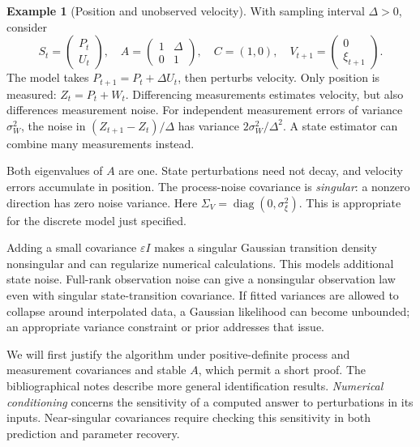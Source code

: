 \documentclass[11pt,twoside]{article}
\DeclareMathOperator{\diag}{diag}
\theoremstyle{definition}
\newtheorem{example}[theorem]{Example}
\theoremstyle{remark}
\begin{document}
\begin{example}[Position and unobserved velocity]
\label{eg:position-velocity}
With sampling interval \(\Delta>0\), consider
\[
 S_t=\begin{pmatrix}P_t\\U_t\end{pmatrix},\quad
 A=\begin{pmatrix}1&\Delta\\0&1\end{pmatrix},\quad C=(1,0),
 \quad V_{t+1}=\begin{pmatrix}0\\\xi_{t+1}\end{pmatrix}.
\]
The model takes \(P_{t+1}=P_t+\Delta U_t\), then perturbs velocity.
Only position is measured: \(Z_t=P_t+W_t\).
Differencing measurements estimates velocity, but also differences
measurement noise. For independent measurement errors of variance
\(\sigma_W^2\), the noise in
\((Z_{t+1}-Z_t)/\Delta\) has variance \(2\sigma_W^2/\Delta^2\).
A state estimator can combine many measurements instead.

Both eigenvalues of \(A\) are one. State perturbations need not decay,
and velocity errors accumulate in position.
The process-noise covariance is \emph{singular}: a nonzero direction
has zero noise variance. Here
\(\Sigma_V=\diag(0,\sigma_\xi^2)\).
This is appropriate for the discrete model just specified.
\end{example}

Adding a small covariance \(\varepsilon I\) makes a singular Gaussian
transition density nonsingular and can regularize numerical calculations.
This models additional state noise. Full-rank observation noise can give
a nonsingular observation law even with singular state-transition covariance.
If fitted variances are allowed
to collapse around interpolated data, a Gaussian likelihood can become
unbounded; an appropriate variance constraint or prior addresses that issue.

We will first justify the algorithm under positive-definite process and
measurement covariances and stable \(A\), which permit a short proof.
The bibliographical notes describe more general identification results.
\emph{Numerical conditioning} concerns the sensitivity of a
computed answer to perturbations in its inputs. Near-singular covariances
require checking this sensitivity in both prediction and parameter recovery.
\end{document}
